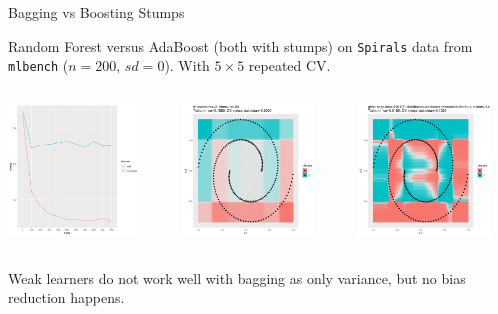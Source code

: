 \begin{vbframe}{Bagging vs Boosting Stumps}



Random Forest versus AdaBoost (both with stumps) on \texttt{Spirals} data from \texttt{mlbench} ($n=200$, $sd=0$).
With $5 \times 5$ repeated CV.

\begin{columns}
\begin{column}{0.33\textwidth}
\begin{center}
\includegraphics[width=3.5cm]{figure_man/stump_plot_ntree.png}
\end{center}
\end{column}
\begin{column}{0.33\textwidth}
\begin{center}
\includegraphics[width=3.5cm]{figure_man/stump_plot_rf.png}
\end{center}
\end{column}
\begin{column}{0.33\textwidth}
\begin{center}
\includegraphics[width=3.5cm]{figure_man/stump_plot_boost.png}
\end{center}
\end{column}
\end{columns}

\lz

Weak learners do not work well with bagging as only variance, but no bias reduction happens.

\end{vbframe}


